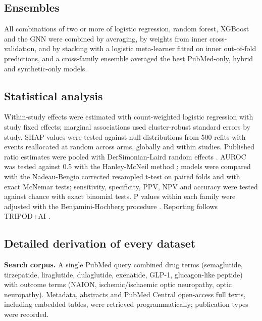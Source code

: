 \documentclass[journal]{IEEEtran}
\begin{document}
\subsection{Ensembles}\label{ensembles}

All combinations of two or more of logistic regression, random forest,
XGBoost and the GNN were combined by averaging, by weights from inner
cross-validation, and by stacking with a logistic meta-learner fitted on
inner out-of-fold predictions, and a cross-family ensemble averaged the
best PubMed-only, hybrid and synthetic-only models.

\subsection{Statistical analysis}\label{statistical-analysis}

Within-study effects were estimated with count-weighted logistic
regression with study fixed effects; marginal associations used
cluster-robust standard errors by study. SHAP values
\cite{lundberg2017} were tested against null distributions from 500
refits with events reallocated at random across arms, globally and
within studies. Published ratio estimates were pooled with
DerSimonian-Laird random effects \cite{dersimonian1986}. AUROC was
tested against 0.5 with the Hanley-McNeil method \cite{hanley1982};
models were compared with the Nadeau-Bengio corrected resampled t-test
\cite{nadeau2003} on paired folds and with exact McNemar tests;
sensitivity, specificity, PPV, NPV and accuracy were tested against
chance with exact binomial tests. P values within each family were
adjusted with the Benjamini-Hochberg procedure \cite{benjamini1995}.
Reporting follows TRIPOD+AI \cite{collins2024}.

\subsection{Detailed derivation of every
dataset}\label{detailed-derivation-of-every-dataset}

\textbf{Search corpus.} A single PubMed query combined drug terms
(semaglutide, tirzepatide, liraglutide, dulaglutide, exenatide, GLP-1,
glucagon-like peptide) with outcome terms (NAION, ischemic/ischaemic
optic neuropathy, optic neuropathy). Metadata, abstracts and PubMed
Central open-access full texts, including embedded tables, were
retrieved programmatically; publication types were recorded.
\end{document}

